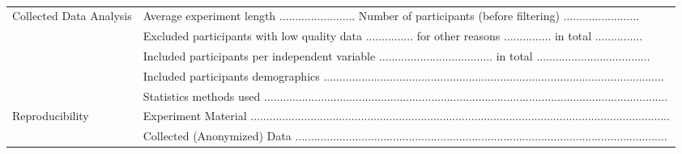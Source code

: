 \begin{table*}
{\begin{tabular}{p{3cm} | p{13cm}}
    \hline
    \multirow{5}{*}{Collected Data Analysis} 
        &
        Average experiment length  ........................ \hspace{0.5cm}
        Number of participants (before filtering)  ........................ \\
        &
        Excluded participants \hspace{0.1cm} 
        with low quality data  ............... \hspace{0.1cm} 
        for other reasons  ............... \hspace{0.1cm} 
        in total  ............... \\
        &
        Included participants \hspace{0.21cm} 
        per independent variable  .................................... \hspace{0.1cm} 
        in total .................................... \\
        &
        Included participants demographics  
        ............................................................................................................\\
        &
        Statistics methods used ................................................................................................................................\\
 
 
    \hline
    \multirow{2}{*}{Reproducibility} 
        &
        Experiment Material .....................................................................................................................................
        \\
        &
        Collected (Anonymized) Data ......................................................................................................................\\
 
    \hline
 
    \end{tabular}
    }
    
    
    \caption{
    }
    \label{tab:reportinf_form}
\end{table*}



